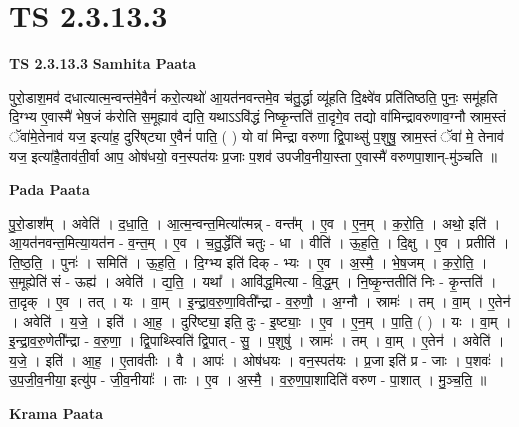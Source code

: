 \documentclass[17pt]{extarticle}
\begin{document}
\section*{ TS 2.3.13.3 }

\textbf{TS 2.3.13.3 } \newline
\textbf{Samhita Paata} \newline

पुरो॒डाश॒मव॑ दधात्यात्म॒न्वन्त॑मे॒वैनं॑ करो॒त्यथो॑ आ॒यत॑नवन्तमे॒व च॑तु॒र्द्धा व्यू॑हति दि॒क्ष्वे॑व प्रति॑तिष्ठति॒ पुनः॒ समू॑हति दि॒ग्भ्य ए॒वास्मै॑ भेष॒जं क॑रोति स॒मूह्याव॑ द्यति॒ यथाऽऽवि॑द्धं निष्कृ॒न्तति॑ ता॒दृगे॒व तद्यो वा॑मिन्द्रावरुणाव॒ग्नौ स्राम॒स्तं ॅवा॑मे॒तेनाव॑ यज॒ इत्या॑ह॒ दुरि॑ष्‌ट्या ए॒वैनं॑ पाति॒ ( ) यो वा॑ मिन्द्रा वरुणा द्वि॒पाथ्सु॑ प॒शुषु॒ स्राम॒स्तं ॅवा॑ मे॒ तेनाव॑ यज॒ इत्या॑है॒ताव॑ती॒र्वा आप॒ ओष॑धयो॒ वन॒स्पत॑यः प्र॒जाः प॒शव॑ उपजीव॒नीया॒स्ता ए॒वास्मै॑ वरुणपा॒शान्-मु॑ञ्चति ॥ \newline

\textbf{Pada Paata} \newline

पु॒रो॒डाश᳚म् । अवेति॑ । द॒धा॒ति॒ । आ॒त्म॒न्वन्त॒मित्या᳚त्मन्न् - वन्त᳚म् । ए॒व । ए॒न॒म् । क॒रो॒ति॒ । अथो॒ इति॑ । आ॒यत॑नवन्त॒मित्या॒यत॑न - व॒न्त॒म् । ए॒व । च॒तु॒र्द्धेति॑ चतुः - धा । वीति॑ । ऊ॒ह॒ति॒ । दि॒क्षु । ए॒व । प्रतीति॑ । ति॒ष्ठ॒ति॒ । पुनः॑ । समिति॑ । ऊ॒ह॒ति॒ । दि॒ग्भ्य इति॑ दिक् - भ्यः । ए॒व ।   अ॒स्मै॒ । भे॒ष॒जम् । क॒रो॒ति॒ । स॒मूह्येति॑ सं - ऊह्य॑ । अवेति॑ । द्य॒ति॒ । यथा᳚ । आवि॑द्ध॒मित्या - वि॒द्ध॒म् । नि॒ष्कृ॒न्ततीति॑ निः - कृ॒न्तति॑ । ता॒दृक् । ए॒व । तत् । यः । वा॒म् । इ॒न्द्रा॒व॒रु॒णा॒विती᳚न्द्रा - व॒रु॒णौ॒ । अ॒ग्नौ । स्रामः॑ । तम् । वा॒म् । ए॒तेन॑ । अवेति॑ । य॒जे॒ । इति॑ । आ॒ह॒ । दुरि॑ष्ट्या॒ इति॒ दुः - इ॒ष्ट्याः॒ । ए॒व । ए॒न॒म् । पा॒ति॒ ( ) । यः । वा॒म् । इ॒न्द्रा॒व॒रु॒णेती᳚न्द्रा - व॒रु॒णा॒ । द्वि॒पाथ्स्विति॑ द्वि॒पात् - सु॒ । प॒शुषु॑ । स्रामः॑ । तम् । वा॒म् ।  ए॒तेन॑ । अवेति॑ । य॒जे॒ । इति॑ । आ॒ह॒ । ए॒ताव॑तीः । वै । आपः॑ । ओष॑धयः । वन॒स्पत॑यः । प्र॒जा इति॑ प्र - जाः । प॒शवः॑ । उ॒प॒जी॒व॒नीया॒ इत्यु॑प - जी॒व॒नीयाः᳚ । ताः । ए॒व । अ॒स्मै॒ । व॒रु॒ण॒पा॒शादिति॑ वरुण - पा॒शात् । मु॒ञ्च॒ति॒ ॥  \newline


\textbf{Krama Paata} \newline
\end{document}
